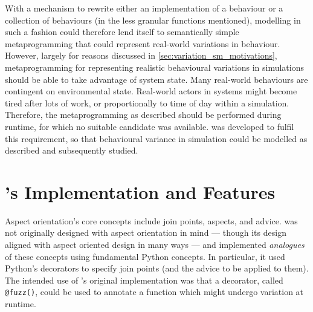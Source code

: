 With a mechanism to rewrite either an implementation of a behaviour or a
collection of behaviours (in the less granular functions mentioned), modelling
in such a fashion could therefore lend itself to semantically simple
metaprogramming that could represent real-world variations in behaviour.
However, largely for reasons discussed in \cref{sec:variation_sm_motivations},
metaprogramming for representing realistic behavioural variations in
\sociotechnical simulations should be able to take advantage of system state.
Many real-world behaviours are contingent on environmental state. Real-world
actors in \sociotechnical systems might become tired after lots of work, or
proportionally to time of day within a simulation. Therefore, the
metaprogramming as described should be performed during runtime, for which no
suitable candidate was available. \pdsf was developed to fulfil this
requirement, so that behavioural variance in \sociotechnical simulation could be
modelled as described and subsequently studied.

\section{\pdsf{}'s Implementation and Features}


Aspect orientation's core concepts include join points, aspects, and advice.
\pdsf was not originally designed with aspect orientation in mind --- though its
design aligned with aspect oriented design in many ways --- and implemented
\emph{analogues} of these concepts using fundamental Python concepts. In
particular, it used Python's decorators to specify join points (and the advice
to be applied to them). The intended use of \pdsf{}'s original implementation
was that a decorator, called \lstinline{@fuzz()}, could be used to annotate a
function which might undergo variation at runtime.


